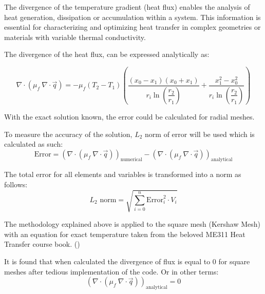 \documentclass[a4paper, 12pt]{article}
\begin{document}
The divergence of the temperature gradient (heat flux) enables the analysis of heat generation, dissipation or accumulation within a system. This information is essential for characterizing and optimizing heat transfer in complex geometries or materials with variable thermal conductivity. \\\par The divergence of the heat flux, can be  expressed analytically as:

\begin{equation}
\nabla \cdot(\mu_f \:\nabla \cdot \vec{q}) = -\mu_f (T_2 - T_1) \left( \dfrac{(x_0 - x_1)(x_0 + x_1)}{r_i \ln\left(\dfrac{r_2}{r_1}\right)} + \dfrac{x_1^2 - x_0^2}{r_i \ln\left(\dfrac{r_2}{r_1}\right)} \right)
\end{equation} \par
With the exact solution known, the error could be calculated for radial meshes. \\\par

To measure the accuracy of the solution, $L_2$ norm of error will be used which is calculated as such:
\begin{equation}
\text{Error} = (\nabla \cdot(\mu_f \:\nabla \cdot \vec{q}))_\text{numerical} - (\nabla \cdot(\mu_f \:\nabla \cdot \vec{q}))_\text{analytical}
\end{equation} \par
The total error for all elements and variables is transformed into a norm as follows:
\begin{equation}
\text{$L_2$ norm} = \sqrt{\sum_{i=0}^{n} \text{Error}_i^2 \cdot V_{i}}
\end{equation} \par
The methodology explained above is applied to the square mesh (Kershaw Mesh) with an equation for exact temperature taken from the beloved ME311 Heat Transfer course book. (\cite{inc})\\\par

It is found that when calculated the divergence of flux is equal to 0 for square meshes after tedious implementation of the code. Or in other terms:
\begin{equation}
    (\nabla \cdot(\mu_f \:\nabla \cdot \vec{q}))_\text{analytical} = 0
\end{equation}
\end{document}
